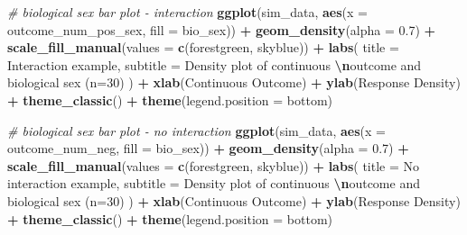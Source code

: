 \documentclass[
]{book}
\newenvironment{Shaded}{\begin{snugshade}}{\end{snugshade}}
\newcommand{\AttributeTok}[1]{\textcolor[rgb]{0.13,0.29,0.53}{#1}}
\newcommand{\CommentTok}[1]{\textcolor[rgb]{0.56,0.35,0.01}{\textit{#1}}}
\newcommand{\FloatTok}[1]{\textcolor[rgb]{0.00,0.00,0.81}{#1}}
\newcommand{\FunctionTok}[1]{\textcolor[rgb]{0.13,0.29,0.53}{\textbf{#1}}}
\newcommand{\NormalTok}[1]{#1}
\newcommand{\SpecialCharTok}[1]{\textcolor[rgb]{0.81,0.36,0.00}{\textbf{#1}}}
\newcommand{\StringTok}[1]{\textcolor[rgb]{0.31,0.60,0.02}{#1}}
\begin{document}
\begin{Shaded}
\begin{Highlighting}[]
\CommentTok{\# biological sex bar plot {-} interaction}
\FunctionTok{ggplot}\NormalTok{(sim\_data, }\FunctionTok{aes}\NormalTok{(}\AttributeTok{x =}\NormalTok{ outcome\_num\_pos\_sex, }\AttributeTok{fill =}\NormalTok{ bio\_sex)) }\SpecialCharTok{+} 
  \FunctionTok{geom\_density}\NormalTok{(}\AttributeTok{alpha =} \FloatTok{0.7}\NormalTok{) }\SpecialCharTok{+}
  \FunctionTok{scale\_fill\_manual}\NormalTok{(}\AttributeTok{values =} \FunctionTok{c}\NormalTok{(}\StringTok{\textquotesingle{}forestgreen\textquotesingle{}}\NormalTok{, }\StringTok{\textquotesingle{}skyblue\textquotesingle{}}\NormalTok{)) }\SpecialCharTok{+}
  \FunctionTok{labs}\NormalTok{(}
    \AttributeTok{title =} \StringTok{\textquotesingle{}Interaction example\textquotesingle{}}\NormalTok{,}
    \AttributeTok{subtitle =} \StringTok{\textquotesingle{}Density plot of continuous }\SpecialCharTok{\textbackslash{}n}\StringTok{outcome and biological sex (n=30)\textquotesingle{}}
\NormalTok{    ) }\SpecialCharTok{+}
  \FunctionTok{xlab}\NormalTok{(}\StringTok{\textquotesingle{}Continuous Outcome\textquotesingle{}}\NormalTok{) }\SpecialCharTok{+} 
  \FunctionTok{ylab}\NormalTok{(}\StringTok{\textquotesingle{}Response Density\textquotesingle{}}\NormalTok{) }\SpecialCharTok{+}
  \FunctionTok{theme\_classic}\NormalTok{() }\SpecialCharTok{+}
  \FunctionTok{theme}\NormalTok{(}\AttributeTok{legend.position =} \StringTok{\textquotesingle{}bottom\textquotesingle{}}\NormalTok{)}

\CommentTok{\# biological sex bar plot {-} no interaction}
\FunctionTok{ggplot}\NormalTok{(sim\_data, }\FunctionTok{aes}\NormalTok{(}\AttributeTok{x =}\NormalTok{ outcome\_num\_neg, }\AttributeTok{fill =}\NormalTok{ bio\_sex)) }\SpecialCharTok{+} 
  \FunctionTok{geom\_density}\NormalTok{(}\AttributeTok{alpha =} \FloatTok{0.7}\NormalTok{) }\SpecialCharTok{+}
  \FunctionTok{scale\_fill\_manual}\NormalTok{(}\AttributeTok{values =} \FunctionTok{c}\NormalTok{(}\StringTok{\textquotesingle{}forestgreen\textquotesingle{}}\NormalTok{, }\StringTok{\textquotesingle{}skyblue\textquotesingle{}}\NormalTok{)) }\SpecialCharTok{+}
  \FunctionTok{labs}\NormalTok{(}
    \AttributeTok{title =} \StringTok{\textquotesingle{}No interaction example\textquotesingle{}}\NormalTok{,}
    \AttributeTok{subtitle =} \StringTok{\textquotesingle{}Density plot of continuous }\SpecialCharTok{\textbackslash{}n}\StringTok{outcome and biological sex (n=30)\textquotesingle{}}
\NormalTok{    ) }\SpecialCharTok{+}
  \FunctionTok{xlab}\NormalTok{(}\StringTok{\textquotesingle{}Continuous Outcome\textquotesingle{}}\NormalTok{) }\SpecialCharTok{+} 
  \FunctionTok{ylab}\NormalTok{(}\StringTok{\textquotesingle{}Response Density\textquotesingle{}}\NormalTok{) }\SpecialCharTok{+}
  \FunctionTok{theme\_classic}\NormalTok{() }\SpecialCharTok{+}
  \FunctionTok{theme}\NormalTok{(}\AttributeTok{legend.position =} \StringTok{\textquotesingle{}bottom\textquotesingle{}}\NormalTok{)}
\end{Highlighting}
\end{Shaded}
\end{document}
